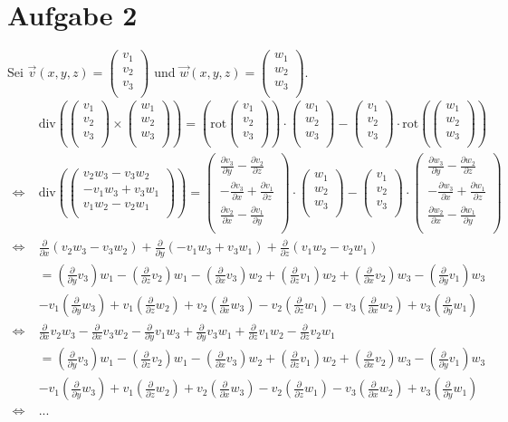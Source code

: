 \documentclass[10pt,a4paper,parskip=half]{scrartcl}
\newcommand{\vecthree}[3]{\begin{pmatrix}#1\\#2\\#3\\\end {pmatrix}}
\begin{document}
\section*{Aufgabe 2}
Sei $\vec v(x,y,z) = \vecthree{v_1}{v_2}{v_3}$ und $\vec w(x,y,z) = \vecthree{w_1}{w_2}{w_3}$. 
\begin{align*}
&\text{div}\left(\vecthree{v_1}{v_2}{v_3} \times \vecthree{w_1}{w_2}{w_3}\right) = \left( \text{rot} \vecthree{v_1}{v_2}{v_3} \right) \cdot \vecthree{w_1}{w_2}{w_3} - \vecthree{v_1}{v_2}{v_3} \cdot \text{rot}\left( \vecthree{w_1}{w_2}{w_3} \right) \\
\Leftrightarrow\; &\text{div}\left(\vecthree{v_2w_3 - v_3w_2}{-v_1w_3 + v_3w_1}{v_1w_2 - v_2w_1}\right) = \vecthree{\frac{\partial v_3}{\partial y} - \frac{\partial v_2}{\partial z}}{- \frac{\partial v_3}{\partial x} + \frac{\partial v_1}{\partial z}}{\frac{\partial v_2}{\partial x} - \frac{\partial v_1}{\partial y}} \cdot \vecthree{w_1}{w_2}{w_3} - \vecthree{v_1}{v_2}{v_3} \cdot \vecthree{\frac{\partial w_3}{\partial y} - \frac{\partial w_2}{\partial z}}{- \frac{\partial w_3}{\partial x} + \frac{\partial w_1}{\partial z}}{\frac{\partial w_2}{\partial x} - \frac{\partial w_1}{\partial y}} \\
\Leftrightarrow\; &\frac{\partial }{\partial x}(v_2w_3 - v_3w_2) + \frac{\partial }{\partial y}(-v_1w_3 + v_3w_1) + \frac{\partial }{\partial z}(v_1w_2 - v_2w_1)\\
&= \left(\frac{\partial }{\partial y}v_3\right)w_1 - \left(\frac{\partial }{\partial z}v_2\right)w_1 - \left(\frac{\partial }{\partial x}v_3\right)w_2 + \left(\frac{\partial }{\partial z}v_1\right)w_2 + \left(\frac{\partial }{\partial x}v_2\right)w_3 - \left(\frac{\partial }{\partial y}v_1\right)w_3\\
 &- v_1\left(\frac{\partial }{\partial y}w_3\right) + v_1\left(\frac{\partial }{\partial z}w_2\right) + v_2\left(\frac{\partial }{\partial x}w_3\right) - v_2\left(\frac{\partial }{\partial z}w_1\right) - v_3\left(\frac{\partial }{\partial x}w_2\right) + v_3\left(\frac{\partial }{\partial y}w_1\right) \\
\Leftrightarrow\; &\frac{\partial }{\partial x}v_2w_3 - \frac{\partial }{\partial x}v_3w_2 - \frac{\partial }{\partial y}v_1w_3 + \frac{\partial }{\partial y}v_3w_1 + \frac{\partial }{\partial z}v_1w_2 - \frac{\partial }{\partial z}v_2w_1\\
&= \left(\frac{\partial }{\partial y}v_3\right)w_1 - \left(\frac{\partial }{\partial z}v_2\right)w_1 - \left(\frac{\partial }{\partial x}v_3\right)w_2 + \left(\frac{\partial }{\partial z}v_1\right)w_2 + \left(\frac{\partial }{\partial x}v_2\right)w_3 - \left(\frac{\partial }{\partial y}v_1\right)w_3\\
 &- v_1\left(\frac{\partial }{\partial y}w_3\right) + v_1\left(\frac{\partial }{\partial z}w_2\right) + v_2\left(\frac{\partial }{\partial x}w_3\right) - v_2\left(\frac{\partial }{\partial z}w_1\right) - v_3\left(\frac{\partial }{\partial x}w_2\right) + v_3\left(\frac{\partial }{\partial y}w_1\right) \\
\Leftrightarrow\; &\text{...}\\
\end{align*}
\end{document}
